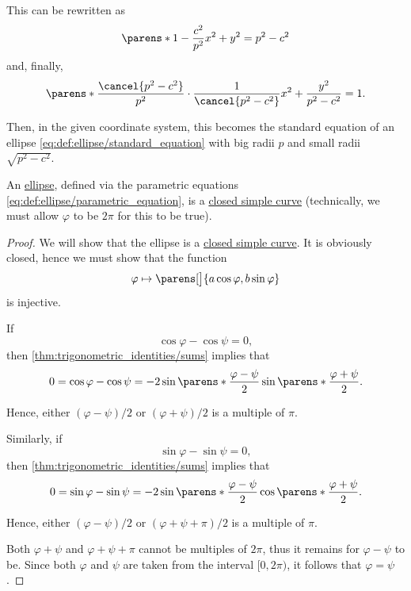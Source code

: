 \begin{defproof}
  This can be rewritten as
  \begin{equation*}
    \parens*{ 1 - \frac {c^2} {p^2} } x^2 + y^2 = p^2 - c^2
  \end{equation*}
  and, finally,
  \begin{equation*}
    \parens*{ \frac {\cancel{p^2 - c^2}} {p^2} \cdot \frac 1 {\cancel{p^2 - c^2}} } x^2 + \frac {y^2} {p^2 - c^2} = 1.
  \end{equation*}

  Then, in the given coordinate system, this becomes the standard equation of an ellipse \eqref{eq:def:ellipse/standard_equation} with big radii \( p \) and small radii \( \sqrt{p^2 - c^2} \).
\end{defproof}

\begin{proposition}\label{thm:ellipse_is_closed_simple_curve}
  An \hyperref[def:ellipse]{ellipse}, defined via the parametric equations \eqref{eq:def:ellipse/parametric_equation}, is a \hyperref[def:simple_curve]{closed simple curve} (technically, we must allow \( \varphi \) to be \( 2\pi \) for this to be true).
\end{proposition}
\begin{proof}
  We will show that the ellipse is a \hyperref[def:simple_curve]{closed simple curve}. It is obviously closed, hence we must show that the function
  \begin{equation*}
    \varphi \mapsto \parens[\big]{ a \cos \varphi, b \sin \varphi }
  \end{equation*}
  is injective.

  If
  \begin{equation*}
    \cos \varphi - \cos \psi = 0,
  \end{equation*}
  then \cref{thm:trigonometric_identities/sums} implies that
  \begin{equation*}
    0
    =
    \cos \varphi - \cos \psi
    =
    -2 \sin\parens*{ \frac{\varphi - \psi} 2 } \sin\parens*{ \frac{\varphi + \psi} 2 }.
  \end{equation*}

  Hence, either \( (\varphi - \psi) / 2 \) or \( (\varphi + \psi) / 2 \) is a multiple of \( \pi \).

  Similarly, if
  \begin{equation*}
    \sin \varphi - \sin \psi = 0,
  \end{equation*}
  then \cref{thm:trigonometric_identities/sums} implies that
  \begin{equation*}
    0
    =
    \sin \varphi - \sin \psi
    =
    -2 \sin\parens*{ \frac{\varphi - \psi} 2 } \cos\parens*{ \frac{\varphi + \psi} 2 }.
  \end{equation*}

  Hence, either \( (\varphi - \psi) / 2 \) or \( (\varphi + \psi + \pi) / 2 \) is a multiple of \( \pi \).

  Both \( \varphi + \psi \) and \( \varphi + \psi + \pi \) cannot be multiples of \( 2\pi \),  thus it remains for \( \varphi - \psi \) to be. Since both \( \varphi \) and \( \psi \) are taken from the interval \( [0, 2\pi) \), it follows that \( \varphi = \psi \).
\end{proof}

